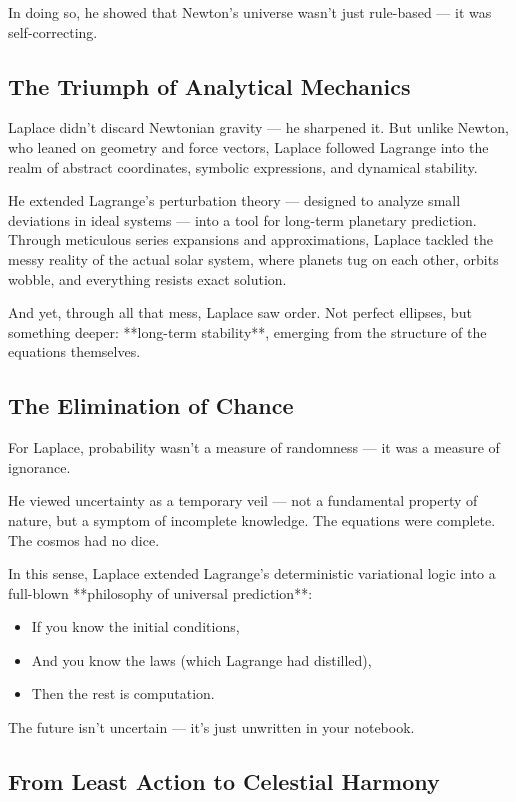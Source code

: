 In doing so, he showed that Newton’s universe wasn’t just rule-based — it was self-correcting.

\subsection{The Triumph of Analytical Mechanics}

Laplace didn’t discard Newtonian gravity — he sharpened it.  
But unlike Newton, who leaned on geometry and force vectors, Laplace followed Lagrange into the realm of abstract coordinates, symbolic expressions, and dynamical stability.

He extended Lagrange’s perturbation theory — designed to analyze small deviations in ideal systems — into a tool for long-term planetary prediction. Through meticulous series expansions and approximations, Laplace tackled the messy reality of the actual solar system, where planets tug on each other, orbits wobble, and everything resists exact solution.

And yet, through all that mess, Laplace saw order.  
Not perfect ellipses, but something deeper: **long-term stability**, emerging from the structure of the equations themselves.

\subsection{The Elimination of Chance}

For Laplace, probability wasn’t a measure of randomness — it was a measure of ignorance.

He viewed uncertainty as a temporary veil — not a fundamental property of nature, but a symptom of incomplete knowledge. The equations were complete. The cosmos had no dice.

In this sense, Laplace extended Lagrange’s deterministic variational logic into a full-blown **philosophy of universal prediction**:
\begin{itemize}
    \item If you know the initial conditions,
    \item And you know the laws (which Lagrange had distilled),
    \item Then the rest is computation.
\end{itemize}

The future isn’t uncertain — it's just unwritten in your notebook.

\subsection{From Least Action to Celestial Harmony}

